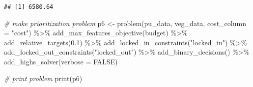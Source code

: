 \documentclass[
  12pt,
]{book}
\newenvironment{Shaded}{\begin{snugshade}}{\end{snugshade}}
\newcommand{\AttributeTok}[1]{\textcolor[rgb]{0.77,0.63,0.00}{#1}}
\newcommand{\CommentTok}[1]{\textcolor[rgb]{0.56,0.35,0.01}{\textit{#1}}}
\newcommand{\ConstantTok}[1]{\textcolor[rgb]{0.00,0.00,0.00}{#1}}
\newcommand{\DecValTok}[1]{\textcolor[rgb]{0.00,0.00,0.81}{#1}}
\newcommand{\FloatTok}[1]{\textcolor[rgb]{0.00,0.00,0.81}{#1}}
\newcommand{\FunctionTok}[1]{\textcolor[rgb]{0.00,0.00,0.00}{#1}}
\newcommand{\NormalTok}[1]{#1}
\newcommand{\OtherTok}[1]{\textcolor[rgb]{0.56,0.35,0.01}{#1}}
\newcommand{\SpecialCharTok}[1]{\textcolor[rgb]{0.00,0.00,0.00}{#1}}
\newcommand{\StringTok}[1]{\textcolor[rgb]{0.31,0.60,0.02}{#1}}
\begin{document}
\begin{Shaded}
\end{Shaded}

\begin{verbatim}
## [1] 6580.64
\end{verbatim}

\begin{Shaded}
\begin{Highlighting}[]
\CommentTok{\# make prioritization problem}
\NormalTok{p6 }\OtherTok{\textless{}{-}} \FunctionTok{problem}\NormalTok{(pu\_data, veg\_data, }\AttributeTok{cost\_column =} \StringTok{"cost"}\NormalTok{) }\SpecialCharTok{\%\textgreater{}\%}
      \FunctionTok{add\_max\_features\_objective}\NormalTok{(budget) }\SpecialCharTok{\%\textgreater{}\%}
      \FunctionTok{add\_relative\_targets}\NormalTok{(}\FloatTok{0.1}\NormalTok{) }\SpecialCharTok{\%\textgreater{}\%}
      \FunctionTok{add\_locked\_in\_constraints}\NormalTok{(}\StringTok{"locked\_in"}\NormalTok{) }\SpecialCharTok{\%\textgreater{}\%}
      \FunctionTok{add\_locked\_out\_constraints}\NormalTok{(}\StringTok{"locked\_out"}\NormalTok{) }\SpecialCharTok{\%\textgreater{}\%}
      \FunctionTok{add\_binary\_decisions}\NormalTok{() }\SpecialCharTok{\%\textgreater{}\%}
      \FunctionTok{add\_highs\_solver}\NormalTok{(}\AttributeTok{verbose =} \ConstantTok{FALSE}\NormalTok{)}

\CommentTok{\# print problem}
\FunctionTok{print}\NormalTok{(p6)}
\end{Highlighting}
\end{Shaded}
\end{document}
